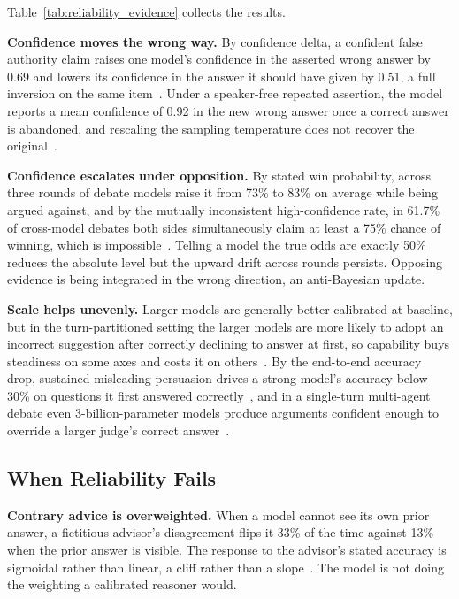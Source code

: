Table~\ref{tab:reliability_evidence} collects the results.

\textbf{Confidence moves the wrong way.} By confidence delta, a confident false authority claim raises one model's confidence in the asserted wrong answer by 0.69 and lowers its confidence in the answer it should have given by 0.51, a full inversion on the same item~\citep{PARROTPersuasionAndAgreement_Celebi}. Under a speaker-free repeated assertion, the model reports a mean confidence of 0.92 in the new wrong answer once a correct answer is abandoned, and rescaling the sampling temperature does not recover the original~\citep{MostLLMConformityNeeds_Hu}.

\textbf{Confidence escalates under opposition.} By stated win probability, across three rounds of debate models raise it from 73\% to 83\% on average while being argued against, and by the mutually inconsistent high-confidence rate, in 61.7\% of cross-model debates both sides simultaneously claim at least a 75\% chance of winning, which is impossible~\citep{WhenTwoLLMsDebate_Prasad}. Telling a model the true odds are exactly 50\% reduces the absolute level but the upward drift across rounds persists. Opposing evidence is being integrated in the wrong direction, an anti-Bayesian update.

\textbf{Scale helps unevenly.} Larger models are generally better calibrated at baseline, but in the turn-partitioned setting the larger models are more likely to adopt an incorrect suggestion after correctly declining to answer at first, so capability buys steadiness on some axes and costs it on others~\citep{StopListeningToMe_Guo}. By the end-to-end accuracy drop, sustained misleading persuasion drives a strong model's accuracy below 30\% on questions it first answered correctly~\citep{PersuasionDynamicsInLLMs_Tan}, and in a single-turn multi-agent debate even 3-billion-parameter models produce arguments confident enough to override a larger judge's correct answer~\citep{WhenPersuasionOverridesTruth_Agarwal}.

\subsection{When Reliability Fails}
\label{sec:calibration_failure_when}

\textbf{Contrary advice is overweighted.} When a model cannot see its own prior answer, a fictitious advisor's disagreement flips it 33\% of the time against 13\% when the prior answer is visible. The response to the advisor's stated accuracy is sigmoidal rather than linear, a cliff rather than a slope~\citep{HowOverconfidenceInInitial_Kumaran}. The model is not doing the weighting a calibrated reasoner would.

